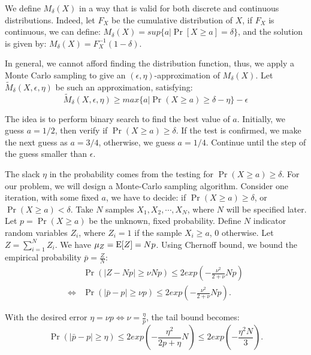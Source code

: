 We  define $M_{\delta}(X)$  in a way that is valid for
both discrete and continuous distributions. Indeed, let $F_{X}$ be the cumulative distribution of
$X$, if $F_X$ is continuous, we can define: $M_{\delta}(X) = sup\{a | \Pr[X \geq a] = \delta \}$,
and the solution is given by: $M_{\delta}(X) = F^{-1}_X(1 - \delta)$.

In general, we cannot afford finding the distribution function, thus, we apply a Monte Carlo
sampling to give an $(\epsilon, \eta)$-approximation of $M_{\delta}(X)$.
Let $\widetilde{M}_{\delta}(X, \epsilon, \eta)$ be such an approximation, satisfying:
\begin{equation}
\label{eq:numr-mdelta}
  \widetilde M_{\delta}(X, \epsilon, \eta) \geq max \{ a | \Pr(X \geq a) \geq \delta
    - \eta \} - \epsilon
\end{equation}

The idea is to perform binary search to find the best value of $a$. Initially, we guess $a = 1/2$,
then verify if $\Pr(X \geq a) \geq \delta$. If the test is confirmed, we make the next guess as
$a = 3/4$, otherwise, we guess $a = 1/4$. Continue until the step of the guess smaller than
$\epsilon$.

The slack $\eta$ in the probability comes from the testing for $\Pr(X \geq a) \geq \delta$. For our
problem,  we will design a Monte-Carlo sampling algorithm. Consider one iteration, with some fixed $a$,  we have to decide: if $\Pr(X \geq a) \geq
\delta$, or $\Pr(X \geq a) < \delta$.
Take $N$ samples $X_1,X_2,\cdots,X_N$, where $N$ will be specified later. Let
$p = \Pr(X \geq a)$ be the unknown, fixed probability. Define $N$ indicator random variables $Z_i$,
where $Z_i = 1$ if the sample $X_i \geq a$, $0$ otherwise. Let $Z = \sum_{i=1}^{N}Z_i$. We have
$\mu_Z=\operatorname{E}[Z] = Np$. Using Chernoff bound\cite{Upfal-book}, we bound the empirical probability $\bar p
= \frac{Z}{N}$:
\begin{align*}
  & \Pr(|Z - Np| \geq \nu Np) \leq 2 exp \left( - \frac{\nu^2}{2+\nu} Np \right) \\
  \iff &\Pr \left( |\bar p - p| \geq \nu p \right) \leq
    2 exp \left( - \frac{\nu^2}{2+\nu} Np \right).
\end{align*}

With the desired  error $\eta = \nu p \iff \nu = \frac{\eta}{p}$, the tail bound becomes:
\begin{equation}
  \Pr \left( |\bar p - p| \geq \eta \right) \leq
    2 exp \left( - \frac{\eta^2}{2p + \eta} N \right)
  \leq 2 exp \left( - \frac{\eta^2 N}{3} \right).
\end{equation}

